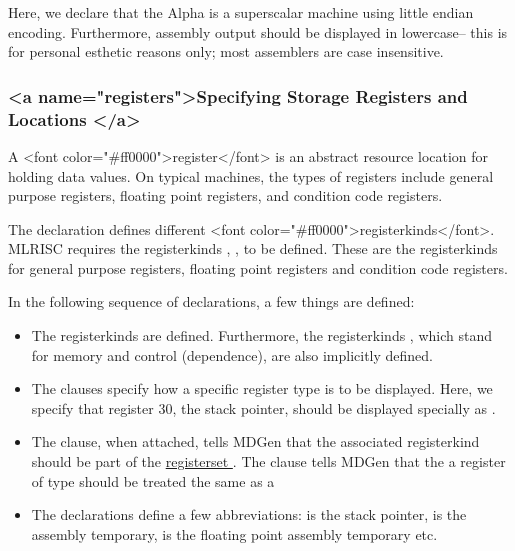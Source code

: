 Here, we declare that the Alpha is a superscalar machine using
little endian encoding.  Furthermore, assembly output should be displayed
in lowercase-- this is for personal esthetic reasons only; most assemblers
are case insensitive.



\subsubsection{ <a name="registers">Specifying Storage Registers and Locations </a>}

A <font color="#ff0000">register</font> is an abstract resource location 
for holding data values.  On typical machines, the types of
registers include general purpose registers, floating point registers,
and condition code registers.

The  declaration defines different 
<font color="#ff0000">registerkinds</font>.  MLRISC requires the
registerkinds , ,  to be defined.
These are the registerkinds for general purpose registers, floating point
registers and condition code registers.

In the following sequence of declarations, a few things are defined:
\begin{itemize}
  \item The registerkinds  are defined.
        Furthermore, the registerkinds , which stand
        for memory and control (dependence), are also implicitly defined.
  \item The  clauses specify how a specific register type is
       to be displayed.    Here, we specify that register 30, the
       stack pointer, should be displayed specially as .
  \item The  clause, when attached, tells MDGen that
       the associated registerkind should be part of the 
       \href{registerset.html}{ registerset }.  The clause 
       tells MDGen that the a register of type  should be treated
       the same as a 
  \item The  declarations define a few abbreviations:
         is the stack pointer,  is
       the assembly temporary,  is the floating point
       assembly temporary etc.
\end{itemize}

